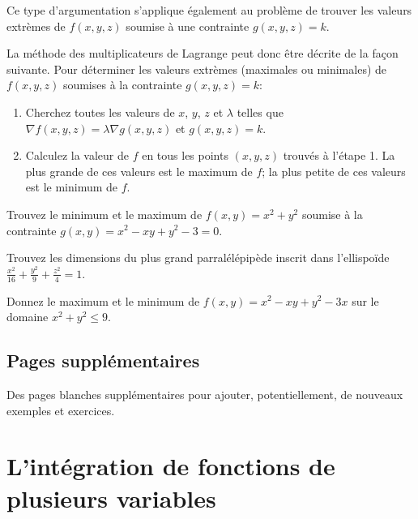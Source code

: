\documentclass[]{book}
\theoremstyle{definition}
\theoremstyle{definition}
\theoremstyle{definition}
\theoremstyle{remark}
\let\BeginKnitrBlock\begin \let\EndKnitrBlock\end
\begin{document}
Ce type d'argumentation s'applique également au problème de trouver les
valeurs extrèmes de \(f(x,y,z)\) soumise à une contrainte
\(g(x,y,z)=k\).

La méthode des multiplicateurs de Lagrange peut donc être décrite de la
façon suivante. Pour déterminer les valeurs extrèmes (maximales ou
minimales) de \(f(x,y,z)\) soumises à la contrainte \(g(x,y,z)=k\):

\begin{enumerate}
\def\labelenumi{\arabic{enumi}.}
\item
  Cherchez toutes les valeurs de \(x\), \(y\), \(z\) et \(\lambda\)
  telles que \(\nabla f(x,y,z) = \lambda \nabla g(x,y,z)\) et
  \(g(x,y,z)=k\).
\item
  Calculez la valeur de \(f\) en tous les points \((x,y,z)\) trouvés à
  l'étape 1. La plus grande de ces valeurs est le maximum de \(f\); la
  plus petite de ces valeurs est le minimum de \(f\).
\end{enumerate}

\BeginKnitrBlock{example}
\protect\hypertarget{exm:unnamed-chunk-235}{}{\label{exm:unnamed-chunk-235}
}Trouvez le minimum et le maximum de \(f(x,y)=x^2+y^2\) soumise à la
contrainte \(g(x,y)=x^2-xy+y^2-3=0\).
\EndKnitrBlock{example}
\vspace*{8cm}

\BeginKnitrBlock{example}
\protect\hypertarget{exm:unnamed-chunk-236}{}{\label{exm:unnamed-chunk-236}
}Trouvez les dimensions du plus grand parralélépipède inscrit dans
l'ellispoïde \(\frac{x^2}{16}+\frac{y^2}{9}+\frac{z^2}{4}=1\).
\EndKnitrBlock{example}
\vspace*{8cm}

\BeginKnitrBlock{example}
\protect\hypertarget{exm:unnamed-chunk-237}{}{\label{exm:unnamed-chunk-237}
}Donnez le maximum et le minimum de \(f(x,y)=x^2-xy+y^2-3x\) sur le
domaine \(x^2+y^2\leq 9\).
\EndKnitrBlock{example}
\vspace*{8cm}

\hypertarget{pages-supplementaires-5}{%
\section{Pages supplémentaires}\label{pages-supplementaires-5}}

Des pages blanches supplémentaires pour ajouter, potentiellement, de
nouveaux exemples et exercices.


\hypertarget{intfctvars}{%
\chapter{L'intégration de fonctions de plusieurs
variables}\label{intfctvars}}
\end{document}
